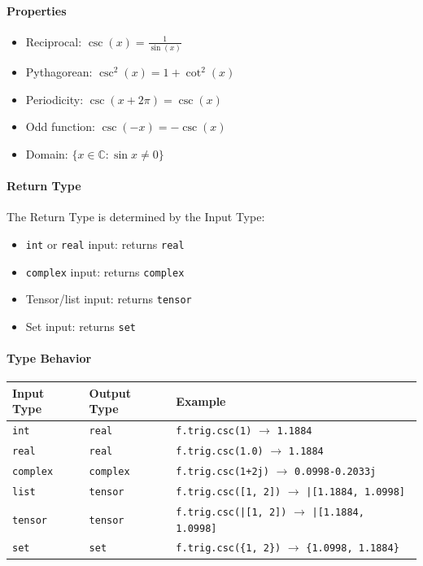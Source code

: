 \paragraph{Properties}
\begin{itemize}
\item Reciprocal: $\csc(x) = \frac{1}{\sin(x)}$
\item Pythagorean: $\csc^2(x) = 1 + \cot^2(x)$
\item Periodicity: $\csc(x + 2\pi) = \csc(x)$
\item Odd function: $\csc(-x) = -\csc(x)$
\item Domain: $\{x \in \mathbb{C} : \sin x \neq 0\}$
\end{itemize}

\paragraph{Return Type}
The Return Type is determined by the Input Type:
\begin{itemize}
\item \texttt{int} or \texttt{real} input: returns \texttt{real}
\item \texttt{complex} input: returns \texttt{complex}
\item Tensor/list input: returns \texttt{tensor}
\item Set input: returns \texttt{set}
\end{itemize}

\paragraph{Type Behavior}
\begin{center}
\begin{tabular}{lll}
\textbf{Input Type} & \textbf{Output Type} & \textbf{Example} \\ \hline
\texttt{int} & \texttt{real} & \texttt{f.trig.csc(1)} $\to$ \texttt{1.1884} \\
\texttt{real} & \texttt{real} & \texttt{f.trig.csc(1.0)} $\to$ \texttt{1.1884} \\
\texttt{complex} & \texttt{complex} & \texttt{f.trig.csc(1+2j)} $\to$ \texttt{0.0998-0.2033j} \\
\texttt{list} & \texttt{tensor} & \texttt{f.trig.csc([1, 2])} $\to$ \texttt{|[1.1884, 1.0998]} \\
\texttt{tensor} & \texttt{tensor} & \texttt{f.trig.csc(|[1, 2])} $\to$ \texttt{|[1.1884, 1.0998]} \\
\texttt{set} & \texttt{set} & \texttt{f.trig.csc(\{1, 2\})} $\to$ \texttt{\{1.0998, 1.1884\}} \\
\end{tabular}
\end{center}

